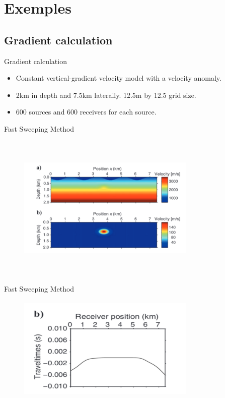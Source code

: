 \documentclass{beamer}
\begin{document}
 
 
 \section{Exemples}
 
 \subsection{Gradient calculation}
 
 \begin{frame}{Gradient calculation}
  \begin{itemize}
   \item Constant vertical-gradient velocity model with a velocity anomaly.
   
   \item 2km in depth and 7.5km laterally. 12.5m by 12.5 grid size.
   
   \item 600 sources and 600 receivers for each source.
  \end{itemize}
 \end{frame}
 
 \begin{frame}{Fast Sweeping Method}
  \centering
  \begin{figure}
   \includegraphics[width=8.5cm,height=7cm]{figuras/imag1.png}
  \end{figure}
 \end{frame}

 \begin{frame}{Fast Sweeping Method}
  \centering
  \begin{figure}
   \includegraphics[width=8.5cm,height=5cm]{figuras/imag2.png}
  \end{figure}
 \end{frame}
 
\end{document}
